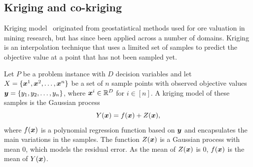 
\subsection{Kriging and co-kriging}

Kriging model~\cite{forrester2008engineering} originated from geostatistical methods used for ore valuation in mining research, but has since been applied across a number of domains. Kriging is an interpolation technique that uses a limited set of samples to predict the objective value at a point that has not been sampled yet.

Let $P$ be a problem instance with $D$ decision variables and let $X = \{\boldsymbol{x}^1,\boldsymbol{x}^2,\dots,\boldsymbol{x}^n\}$ be a set of $n$ sample points with observed objective values $\boldsymbol{y} = \{y_1,y_2,\dots,y_n\}$, where $\boldsymbol{x}^i \in \mathbb{R}^D$ for $i \in [n]$. A kriging model of these samples is the Gaussian process 
\begin{equation}
Y(\boldsymbol{x}) = f(\boldsymbol{x}) + Z(\boldsymbol{x}),\label{eq:krig}
\end{equation}
where $f(\boldsymbol{x})$ is a polynomial regression function based on $\boldsymbol{y}$ and encapsulates the main variations in the samples. The function $Z(\boldsymbol{x})$ is a Gaussian process with mean $0$, which models the residual error. As the mean of $Z(\boldsymbol{x})$ is 0, $f(\boldsymbol{x})$ is the mean of $Y(\boldsymbol{x})$. 


